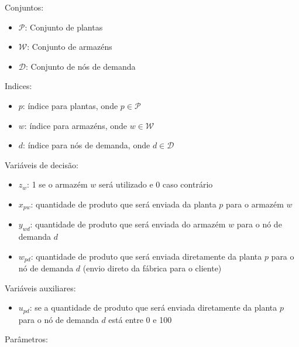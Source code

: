 \documentclass[12pt,a4paper]{article}
\begin{document}
Conjuntos:

\begin{itemize}
    \item $\mathcal{P}$: Conjunto de plantas
    \item $\mathcal{W}$: Conjunto de armazéns
    \item $\mathcal{D}$: Conjunto de nós de demanda
\end{itemize}

Indices:

\begin{itemize}
    \item $p$: índice para plantas, onde $p \in \mathcal{P}$
    \item $w$: índice para armazéns, onde $w \in \mathcal{W}$
    \item $d$: índice para nós de demanda, onde $d \in \mathcal{D}$
\end{itemize}


Variáveis de decisão:

\begin{itemize}
    \item $z_{w}$: 1 se o armazém $w$ será utilizado e 0 caso contrário
    \item $x_{pw}$: quantidade de produto que será enviada da planta $p$ para o armazém $w$
    \item $y_{wd}$: quantidade de produto que será enviada do armazém $w$ para o nó de demanda $d$
    \item $w_{pd}$: quantidade de produto que será enviada diretamente da planta $p$ para o nó de demanda $d$ (envio direto da fábrica para o cliente)
\end{itemize}

Variáveis auxiliares:
\begin{itemize}
    \item $u_{pd}$: se a quantidade de produto que será enviada diretamente da planta $p$ para o nó de demanda $d$ está entre 0 e 100
\end{itemize}

Parâmetros:
\end{document}

